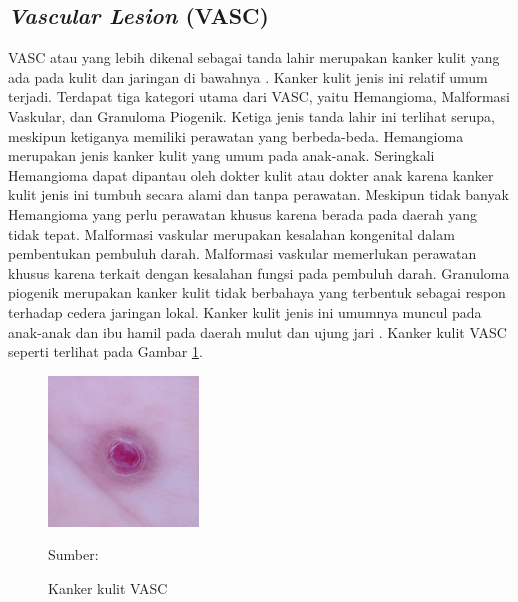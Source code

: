     \subsection{\textit{Vascular Lesion} (VASC)}
    VASC atau yang lebih dikenal sebagai tanda lahir merupakan kanker kulit yang ada pada kulit dan jaringan di bawahnya \citep{Balas2018}. Kanker kulit jenis ini relatif umum terjadi. Terdapat tiga kategori utama dari VASC, yaitu Hemangioma, Malformasi Vaskular, dan Granuloma Piogenik. Ketiga jenis tanda lahir ini terlihat serupa, meskipun ketiganya memiliki perawatan yang berbeda-beda. Hemangioma merupakan jenis kanker kulit yang umum pada anak-anak. Seringkali Hemangioma dapat dipantau oleh dokter kulit atau dokter anak karena kanker kulit jenis ini tumbuh secara alami dan tanpa perawatan. Meskipun tidak banyak Hemangioma yang perlu perawatan khusus karena berada pada daerah yang tidak tepat. Malformasi vaskular merupakan kesalahan kongenital dalam pembentukan pembuluh darah. Malformasi vaskular memerlukan perawatan khusus karena terkait dengan kesalahan fungsi pada pembuluh darah. Granuloma piogenik merupakan kanker kulit tidak berbahaya yang terbentuk sebagai respon terhadap cedera jaringan lokal. Kanker kulit jenis ini umumnya muncul pada anak-anak dan ibu hamil pada daerah mulut dan ujung jari \citep{Rastogi2020}. Kanker kulit VASC seperti terlihat pada Gambar \ref{fig:vasc}.
    \begin{figure}[H] 
        \begin{center} 
            \includegraphics[width=4cm]{../img/Skin Cancer VASC - Latex.jpg}
            \caption{Kanker kulit VASC} 
            \label{fig:vasc}
            Sumber: \citep{Codella2018,Combalia2019,Tschandl2018}
        \end{center} 
    \end{figure}

